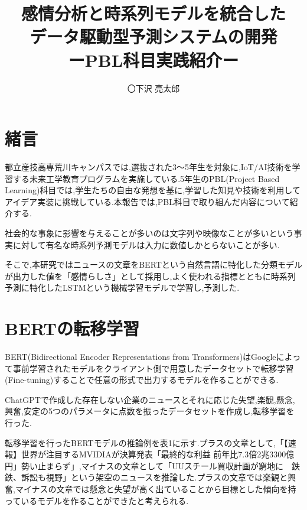 \documentclass[a4paper,11pt]{article}
\title{{\TitleJFont\bfseries 感情分析と時系列モデルを統合した\\データ駆動型予測システムの開発 \\ ーPBL科目実践紹介ー}}
\author[1]{〇下沢 亮太郎}
\affil[1]{東京都立産業技術高等専門学校\\ものづくり工学科 情報通信工学コース}
\date{}
\newenvironment{customabstract}
{\noindent\hfuzz=10pt\hbadness=10000\begin{flushleft}\small}
{\end{flushleft}}
\begin{document}
\setlength{\columnsep}{20pt}

\twocolumn[
    \maketitle

    \thispagestyle{empty}

    \vspace{-2em}
    \begin{customabstract}
    　キーワード : 機械学習 時系列予測 感情分析 BERT LSTM
    \end{customabstract}
]

\section{緒言}

都立産技高専荒川キャンパスでは,選抜された3～5年生を対象に,IoT/AI技術を学習する未来工学教育プログラムを実施している.5年生のPBL(Project Based Learning)科目では,学生たちの自由な発想を基に,学習した知見や技術を利用してアイデア実装に挑戦している.本報告では,PBL科目で取り組んだ内容について紹介する.

社会的な事象に影響を与えることが多いのは文字列や映像なことが多いという事実に対して有名な時系列予測モデルは入力に数値しかとらないことが多い.

そこで,本研究ではニュースの文章をBERTという自然言語に特化した分類モデルが出力した値を「感情らしさ」として採用し,よく使われる指標とともに時系列予測に特化したLSTMという機械学習モデルで学習し,予測した.

\section{BERTの転移学習}
BERT(Bidirectional Encoder Representations from Transformers)はGoogleによって事前学習されたモデルをクライアント側で用意したデータセットで転移学習(Fine-tuning)することで任意の形式で出力するモデルを作ることができる.

ChatGPTで作成した存在しない企業のニュースとそれに応じた失望,楽観,懸念,興奮,安定の5つのパラメータに点数を振ったデータセットを作成し,転移学習を行った.

転移学習を行ったBERTモデルの推論例を表1に示す.プラスの文章として,「【速報】世界が注目するMVIDIAが決算発表「最終的な利益 前年比7.3倍2兆3300億円」勢い止まらず」,マイナスの文章として「UUスチール買収計画が窮地に　鉄鉄、訴訟も視野」という架空のニュースを推論した.プラスの文章では楽観と興奮,マイナスの文章では懸念と失望が高く出ていることから目標とした傾向を持っているモデルを作ることができたと考えられる.
\end{document}
